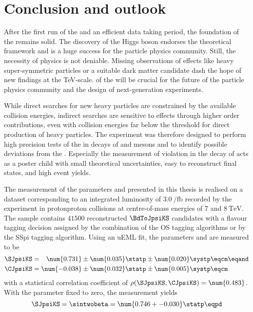 
\chapter{Conclusion and outlook}
\label{ch:conclusion}

After the first run of the \LHC and an efficient data taking period, the
foundation of the \SM remains solid. The discovery of the Higgs boson
\cite{Aad:2015zhl} endorses the theoretical framework and is a huge success for
the particle physics community. Still, the necessity of \BSM physics is not
deniable. Missing observations of \BSM effects like heavy super-symmetric
particles or a suitable dark matter candidate dash the hope of new findings at
the \si{TeV}-scale. \RunTwo of the \LHC will be crucial for the future of the
particle physics community and the design of next-generation experiments.

While direct searches for new heavy particles are constrained by the available
collision energies, indirect searches are sensitive to \BSM effects through
higher order contributions, even with collision energies far below the threshold
for direct production of heavy particles. The \LHCb experiment was therefore
designed to perform high precision tests of the \SM in decays of \B and \D
mesons and to identify possible deviations from the \SM. Especially the
measurement of \CP violation in the decay of \BdToJpsiKS acts as a poster child
with small theoretical uncertainties, easy to reconstruct final states, and high
event yields.

The measurement of the \CP parameters \SJpsiKS and \CJpsiKS presented in this
thesis is realised on a dataset corresponding to an integrated luminosity of
$\SI{3.0}{\per\femto\barn}$ recorded by the \LHCb experiment in
\acl{protonproton} collisions at centre-of-mass energies of $\num{7}$ and
$\SI{8}{\TeV}$. The sample contains $\num{41500}$ reconstructed $\BdToJpsiKS$
candidates with a flavour tagging decision assigned by the combination of the
\acl{OS} tagging algorithms or by the \acl{SSpi} tagging algorithm. Using an
\acl{uEML} fit, the \CP parameters \SJpsiKS and \CJpsiKS are measured to be
%
\begin{equation*}
  \begin{split}
    \SJpsiKS &= \phantom{-}\num{0.731} \pm \num{0.035} \statp \pm \num{0.020} \systp \eqcm\eqand \\
    \CJpsiKS &=           \num{-0.038} \pm \num{0.032} \statp \pm \num{0.005} \systp \eqcm
  \end{split}
\end{equation*}
%
with a statistical correlation coefficient of $\rho(\SJpsiKS,\CJpsiKS) =
\num{0.483}$. With the parameter \CJpsiKS fixed to zero, the measurement yields
%
\begin{equation*}
  \SJpsiKS = \sintwobeta = \num{0.746 +- 0.030}\statp \eqpd
\end{equation*}

